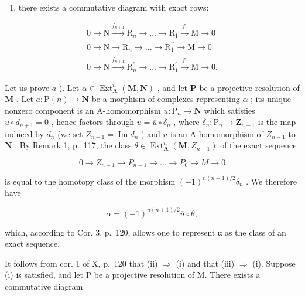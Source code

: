 \begin{enumerate}
\def\labelenumi{(\roman{enumi})}
\setcounter{enumi}{2}
\tightlist
\item
  there exists a commutative diagram with exact rows:
\end{enumerate}

\[
\begin{array}{c} 0 \longrightarrow \mathrm{N} \xrightarrow {f _ {n + 1}} \mathrm{R} _ {n} \longrightarrow \dots \longrightarrow \mathrm{R} _ {1} \xrightarrow {f _ {1}} \mathrm{M} \longrightarrow 0 \\ 0 \longrightarrow \mathrm{N} \longrightarrow \mathrm{R} _ {n} ^ {\prime \prime} \longrightarrow \dots \longrightarrow \mathrm{R} _ {1} ^ {\prime \prime} \longrightarrow \mathrm{M} \longrightarrow 0 \\ 0 \longrightarrow \mathrm{N} \xrightarrow {f _ {n + 1} ^ {\prime}} \mathrm{R} _ {n} ^ {\prime} \longrightarrow \dots \longrightarrow \mathrm{R} _ {1} ^ {\prime} \xrightarrow {f _ {1} ^ {\prime}} \mathrm{M} \longrightarrow 0. \end{array}
\]

Let us prove \(a\) ). Let \(\alpha \in \operatorname{Ext}_{\mathbf{A}}^{n}(\mathbf{M}, \mathbf{N})\) , and let \(\mathbf{P}\) be a projective resolution of \(\mathbf{M}\) . Let \(a: \mathrm{P}(n) \to \mathbf{N}\) be a morphism of complexes representing \(\alpha\) ; its unique nonzero component is an A-homomorphism \(u: \mathrm{P}_{n} \to \mathbf{N}\) which satisfies \(u \circ d_{n+1} = 0\) , hence factors through \(u = \overline{u} \circ \delta_{n}\) , where \(\delta_{n}: \mathrm{P}_{n} \to \dot{\mathbf{Z}}_{n-1}\) is the map induced by \(d_{n}\) (we set \(Z_{n-1} = \operatorname{Im} d_{n}\) ) and \(\overline{u}\) is an A-homomorphism of \(Z_{n-1}\) to \(\mathbf{N}\) . By Remark 1, p.~117, the class \(\theta \in \operatorname{Ext}_{\mathbf{A}}^{n}(\mathbf{M}, Z_{n-1})\) of the exact sequence

\[
0 \rightarrow Z _ {n - 1} \rightarrow P _ {n - 1} \rightarrow \dots \rightarrow P _ {0} \rightarrow M \rightarrow 0
\]

is equal to the homotopy class of the morphism \((-1)^{n(n + 1) / 2}\delta_n\) . We therefore have

\[
\alpha = (- 1) ^ {n (n + 1) / 2} \overline {{{u}}} \circ \theta ,
\]

which, according to Cor. 3, p.~120, allows one to represent α as the class of an exact sequence.

It follows from cor. 1 of X, p.~120 that (ii) \(\Rightarrow\) (i) and that (iii) \(\Rightarrow\) (i). Suppose (i) is satisfied, and let P be a projective resolution of M. There exists a commutative diagram

